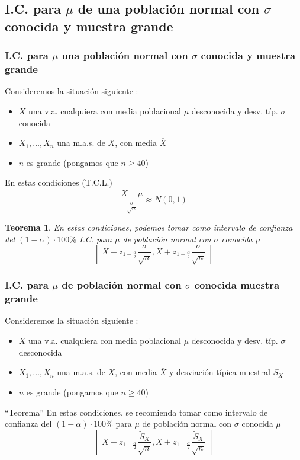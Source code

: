 \documentclass[12pt,t]{beamer}\usepackage[]{graphicx}\usepackage[]{color}
\renewcommand{\emph}[1]{{\color{red}#1}}
\renewcommand{\geq}{\geqslant}
\theoremstyle{plain}
\newtheorem{teorema}{Teorema}
\theoremstyle{definition}
\begin{document}
\subsection{I.C. para $\mu$ de una población normal con $\sigma$ conocida y  muestra grande}

\begin{frame}
\frametitle{I.C. para $\mu$ una población normal con $\sigma$ conocida y  muestra grande}

Consideremos la situación siguiente  :
\begin{itemize}
\item  $X$ una v.a.  \emph{cualquiera} con media   poblacional $\mu$ desconocida y desv. típ. $\sigma$ conocida

\item $X_1,\ldots,X_n$ una m.a.s. de $X$, con media   $\overline{X}$

\item \emph{$n$ es grande} (pongamos que $n\geq 40$)
\end{itemize}


En estas  condiciones (T.C.L.)
$$
\frac{\overline{X}-\mu}{\frac{\sigma}{\sqrt{n}}}\approx N(0,1)
$$


\begin{teorema}
En estas  condiciones, podemos tomar como intervalo  de confianza  del $(1-\alpha)\cdot 100\%$ I.C. para $\mu$ de población normal con $\sigma$ conocida $\mu$
$$
\left]\overline{X}-z_{1-\frac{\alpha}{2}}\frac{\sigma}{\sqrt{n}},
    \overline{X}+z_{1-\frac{\alpha}{2}}\frac{\sigma}{\sqrt{n}}\right[
$$
\end{teorema}
\end{frame}


\begin{frame}
\frametitle{I.C. para $\mu$ de población normal con $\sigma$ conocida muestra grande}

Consideremos  la situación siguiente  :
\begin{itemize}
\item  $X$ una v.a.  \emph{cualquiera} con media   poblacional $\mu$ desconocida  \emph{y desv. típ. $\sigma$ desconocida}

\item $X_1,\ldots,X_n$ una m.a.s. de $X$, con media   $\overline{X}$ \emph{y desviación típica muestral $\widetilde{S}_X$}

\item \emph{$n$ es grande} (pongamos que $n\geq 40$)
\end{itemize}


\begin{block}{``Teorema''}
En estas  condiciones, se recomienda tomar como  intervalo  de
confianza  del $(1-\alpha)\cdot 100\%$  para $\mu$ de población normal con $\sigma$ conocida $\mu$
$$
\left]\overline{X}-z_{1-\frac{\alpha}{2}}\frac{\widetilde{S}_X}{\sqrt{n}},
    \overline{X}+z_{1-\frac{\alpha}{2}}\frac{\widetilde{S}_X}{\sqrt{n}}\right[
$$
\end{block}



\end{frame}
\end{document}
